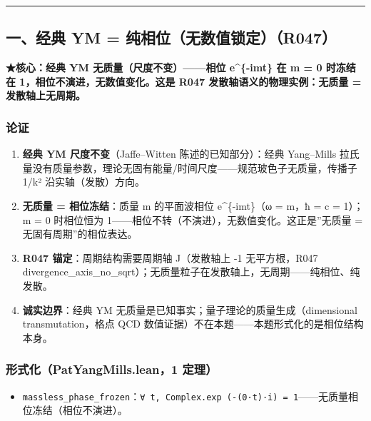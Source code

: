 \documentclass[
]{article}
\providecommand{\tightlist}{%
 \setlength{\itemsep}{0pt}\setlength{\parskip}{0pt}}
\begin{document}
\begin{center}\rule{0.5\linewidth}{0.5pt}\end{center}

\subsection{一、经典 YM =
纯相位（无数值锁定）（R047）}\label{ux4e00ux7ecfux5178-ym-ux7eafux76f8ux4f4dux65e0ux6570ux503cux9501ux5b9ar047}

\textbf{★核心：经典 YM 无质量（尺度不变）------相位 e\^{}\{-imt\} 在 m =
0 时冻结在 1，相位不演进，无数值变化。这是 R047
发散轴语义的物理实例：无质量 = 发散轴上无周期。}

\subsubsection{论证}\label{ux8bbaux8bc1}

\begin{enumerate}
\def\labelenumi{\arabic{enumi}.}
\tightlist
\item
 \textbf{经典 YM 尺度不变}（Jaffe--Witten 陈述的已知部分）：经典
 Yang--Mills
 拉氏量没有质量参数，理论无固有能量/时间尺度------规范玻色子无质量，传播子
 1/k² 沿实轴（发散）方向。
\item
 \textbf{无质量 = 相位冻结}：质量 m 的平面波相位 e\^{}\{-imt\}（ω =
 m，ħ = c = 1）；m = 0 时相位恒为
 1------相位不转（不演进），无数值变化。这正是''无质量 =
 无固有周期''的相位表达。
\item
 \textbf{R047 锚定}：周期结构需要周期轴 J（发散轴上 -1 无平方根，R047
 divergence\_axis\_no\_sqrt）；无质量粒子在发散轴上，无周期------纯相位、纯发散。
\item
 \textbf{诚实边界}：经典 YM
 无质量是已知事实；量子理论的质量生成（dimensional transmutation，格点
 QCD 数值证据）不在本题------本题形式化的是相位结构本身。
\end{enumerate}

\subsubsection{形式化（PatYangMills.lean，1
定理）}\label{ux5f62ux5f0fux5316patyangmills.lean1-ux5b9aux7406}

\begin{itemize}
\tightlist
\item
 \texttt{massless\_phase\_frozen}：\texttt{∀\ t,\ Complex.exp\ (-(0·t)·i)\ =\ 1}------无质量相位冻结（相位不演进）。
\end{itemize}
\end{document}
